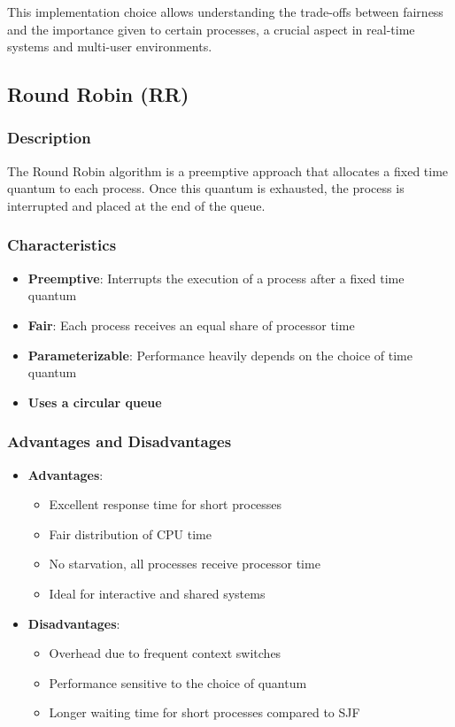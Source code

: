 \documentclass[12pt,a4paper]{article}
\begin{document}
This implementation choice allows understanding the trade-offs between fairness and the importance given to certain processes, a crucial aspect in real-time systems and multi-user environments.

\subsection{Round Robin (RR)}
\subsubsection{Description}
The Round Robin algorithm is a preemptive approach that allocates a fixed time quantum to each process. Once this quantum is exhausted, the process is interrupted and placed at the end of the queue.

\subsubsection{Characteristics}
\begin{itemize}
    \item \textbf{Preemptive}: Interrupts the execution of a process after a fixed time quantum
    \item \textbf{Fair}: Each process receives an equal share of processor time
    \item \textbf{Parameterizable}: Performance heavily depends on the choice of time quantum
    \item \textbf{Uses a circular queue}
\end{itemize}

\subsubsection{Advantages and Disadvantages}
\begin{itemize}
    \item \textbf{Advantages}:
    \begin{itemize}
        \item Excellent response time for short processes
        \item Fair distribution of CPU time
        \item No starvation, all processes receive processor time
        \item Ideal for interactive and shared systems
    \end{itemize}
    \item \textbf{Disadvantages}:
    \begin{itemize}
        \item Overhead due to frequent context switches
        \item Performance sensitive to the choice of quantum
        \item Longer waiting time for short processes compared to SJF
    \end{itemize}
\end{itemize}
\end{document}
